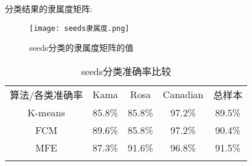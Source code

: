 \newpage
分类结果的隶属度矩阵:
\begin{figure}[!ht]
    \centering
    \texttt{[image: seeds隶属度.png]}
    \caption{seeds分类的隶属度矩阵的值}
    \label{seeds隶属度}
\end{figure}

\begin{table}[!ht]
    \label{seeds准确率比较}
    \caption{seeds分类准确率比较}
    \centering
    \begin{tabular}{c|c c c c}
        \whline 算法/各类准确率 & Kama  & Rosa & Canadian & 总样本 \\\whline
        K-means                 & 85.8\% & 85.8\% & 97.2\%     & 89.5\% \\
        FCM                     & 89.6\% & 85.8\% & 97.2\%     & 90.4\%   \\
        MFE                     & 87.3\% & 91.6\% & 96.8\%     & 91.5\% \\
        \whline
    \end{tabular}
    \label{seeds算法比较}
\end{table}